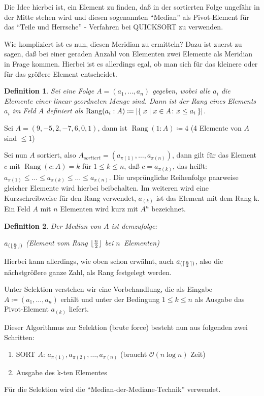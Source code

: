 \documentclass[ngerman,draft,parskip=half*,twoside]{scrreprt}
\theoremstyle{break}
\newtheorem{definition}{Definition}[chapter]
\theoremstyle{nonumberbreak}
\newcommand*{\OO}{\mathcal{O}}      %
\DeclareMathOperator{\rg}{Rang}     %
\DeclarePairedDelimiter{\abs}{\lvert}{\rvert}
\DeclarePairedDelimiter{\floor}{\lfloor}{\rfloor}
\DeclarePairedDelimiter{\ceil}{\lceil}{\rceil}
\begin{document}
 Die Idee hierbei ist, ein Element zu finden, daß in der sortierten Folge ungefähr in der Mitte stehen wird und diesen sogenannten
 "`Median"' als Pivot-Element für das "`Teile und Herrsche"' - Verfahren bei \textsc{QUICKSORT} zu verwenden.

 Wie kompliziert ist es nun, diesen Meridian zu ermitteln? Dazu ist zuerst zu sagen, daß bei einer geraden Anzahl von Elementen zwei
 Elemente als Meridian in Frage kommen. Hierbei ist es allerdings egal, ob man sich für das kleinere oder für das größere Element
 entscheidet.

\begin{definition}
 Sei eine Folge $A=(a_{1}, \ldots , a_{n})$ gegeben, wobei alle $a_{i}$ die Elemente einer linear geordneten Menge sind. 
 Dann ist der Rang eines Elements $a_i$ im Feld $A$ definiert als
 $\rg(a_{i}:A)\coloneqq \abs{\Set{x | x \in A\colon x\leq a_{i}}}$.
\end{definition}

 Sei $A=(9,-5,2,-7,6,0,1)$, dann ist $\rg(1:A)\coloneqq 4$ (4 Elemente von $A$ sind $\leq 1$)


Sei nun $A$ sortiert, also $A_{sortiert}=(a_{\pi(1)}, \ldots , a_{\pi(n)})$, dann gilt für das Element $c$ mit $\rg(c:A)=k$ für $1\leq k
\leq n$, daß $c=a_{\pi(k)}$, das heißt:
$a_{\pi(1)}\leq \ldots \leq a_{\pi(k)}\leq \ldots \leq a_{\pi(n)}$.
Die ursprüngliche Reihenfolge paarweise gleicher Elemente wird hierbei beibehalten. Im weiteren wird
eine Kurzschreibweise für den Rang verwendet, $a_{(k)}$ ist das Element mit dem Rang k. Ein Feld $A$ mit $n$ Elementen wird kurz mit $A^n$
bezeichnet.

\begin{definition}
Der Median von $A$ ist demzufolge:

$a_{(\floor{ \frac{n}{2}})}$ (Element vom Rang $\floor{ \frac{n}{2}}$ bei $n$~Elementen)
\end{definition}

Hierbei kann allerdings, wie oben schon erwähnt, auch $a_{(\ceil{ \frac{n}{2}})}$, also die nächstgrößere
ganze Zahl, als Rang festgelegt werden.

Unter Selektion verstehen wir eine Vorbehandlung, die als Eingabe 
$A\coloneqq (a_{1}, \ldots , a_{n})$ erhält und unter der Bedingung $1\leq k\leq n$ als Ausgabe das Pivot-Element $a_{(k)}$ liefert.

 Dieser Algorithmus zur Selektion (brute force) besteht nun aus folgenden zwei Schritten:
 \begin{enumerate}
	\item SORT $A$: $a_{\pi(1)}, a_{\pi(2)}, \ldots , a_{\pi(n)}$ (braucht $\OO(n \log n)$ Zeit)
	\item Ausgabe des k-ten Elementes
 \end{enumerate}
 Für die Selektion wird die "`Median-der-Mediane-Technik"' verwendet. 
\end{document}
